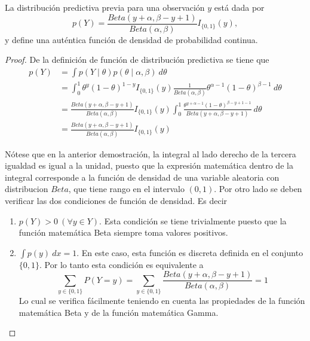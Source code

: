 \documentclass[10pt,openright]{book}\usepackage[]{graphicx}\usepackage[]{color}
\begin{document}
    \begin{Res}
    La distribuci\'on predictiva previa para una observaci\'on $y$ est\'a dada por
    \begin{equation}\label{Predi_previa_bernou}
    p(Y)=\frac{Beta(y+\alpha,\beta-y+1)}{Beta(\alpha,\beta)}I_{\{0,1\}}(y),
    \end{equation}
    y define una aut\'entica funci\'on de densidad de probabilidad continua.
    \end{Res}
    
    \begin{proof}
    De la definici\'on de funci\'on de distribuci\'on predictiva se tiene que
    \begin{align*}
    p(Y)&=\int p(Y \mid \theta)p(\theta \mid \alpha,\beta)\ d\theta\\
    &=\int_0^1 \theta^y(1-\theta)^{1-y}I_{\{0,1\}}(y)\frac{1}{Beta(\alpha,\beta)}\theta^{\alpha-1}(1-\theta)^{\beta-1}\ d\theta\\
    &=\frac{Beta(y+\alpha,\beta-y+1)}{Beta(\alpha,\beta)}I_{\{0,1\}}(y)
    \int_0^1\frac{\theta^{y+\alpha-1}(1-\theta)^{\beta-y+1-1}}{Beta(y+\alpha,\beta-y+1)}\ d\theta\\
    &=\frac{Beta(y+\alpha,\beta-y+1)}{Beta(\alpha,\beta)}I_{\{0,1\}}(y)
    \end{align*}
    
    N\'otese que en la anterior demostraci\'on, la integral al lado derecho de la tercera igualdad es igual a la unidad, puesto que la expresi\'on matem\'atica dentro de la integral corresponde a la funci\'on de densidad de una variable aleatoria con distribucion $Beta$, que tiene rango en el intervalo $(0,1)$. Por otro lado se deben verificar las dos condiciones de funci\'on de densidad. Es decir
    \begin{enumerate}
    \item $p(Y)>0 ~(\forall y\in Y)$. Esta condici\'on se tiene trivialmente puesto que la funci\'on matem\'atica Beta siempre toma valores positivos.
    \item $\int p(y)\ dx=1$. En este caso, esta funci\'on es discreta definida en el conjunto $\{0,1\}$. Por lo tanto esta condici\'on es equivalente a
    \begin{equation*}
    \sum_{y\in{\{0,1\}}}P(Y=y)=\sum_{y\in{\{0,1\}}}\frac{Beta(y+\alpha,\beta-y+1)}{Beta(\alpha,\beta)}=1
    \end{equation*}
    Lo cual se verifica f\'acilmente teniendo en cuenta las propiedades de la funci\'on matem\'atica Beta y de la funci\'on matem\'atica Gamma.
    \end{enumerate}
    \end{proof}
    
\end{document}
